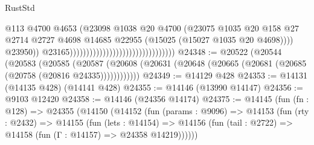 \begin{lexlean}{RustStd}
\begin{coremodule}
                                                                        @113
                                                                        @4700
                                                                        @4653
                                                                        (@23098
                                                                          @1038
                                                                          @20
                                                                          @4700
                                                                          (@23075
                                                                            @1035
                                                                            @20
                                                                            @158
                                                                            @27
                                                                            @2714
                                                                            @2727
                                                                            @4698
                                                                            @14685
                                                                            @22955
                                                                            (@15025
                                                                              (@15027
                                                                                @1035
                                                                                @20
                                                                                @4698))))
                                                                        @23950))
                                                                    @23165))))))))))))))))))))))))))))))))
@24348 := @20522
    (@20544
      (@20583
        (@20585
          (@20587 (@20608 (@20631 (@20648 (@20665 (@20681 (@20685 (@20758 (@20816 @24335))))))))))))
@24349 := @14129 @428
@24353 := @14131 (@14135 @428) (@14141 @428)
@24355 := @14146 (@13990 @14147)
@24356 := @9103 @12420
@24358 := @14146 (@24356 @14174)
@24375 := @14145
    (fun (fn : @128) =>
    @24355
      (@14150
        (@14152
          (fun (params : @9096) =>
          @14153
            (fun (rty : @2432) =>
            @14155
              (fun (lets : @14154) =>
              @14156 (fun (tail : @2722) => @14158 (fun (Γ : @14157) => @24358 @14219))))))

\end{coremodule}
\end{lexlean}
